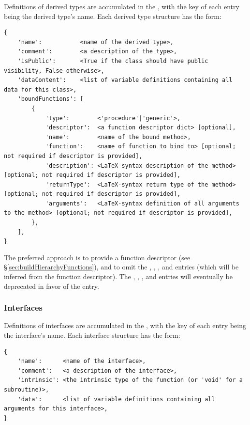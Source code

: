 Definitions of derived types are accumulated in the  , with the key of each entry being the derived type's name. Each derived type structure has the form:
\begin{verbatim}
{
    'name':           <name of the derived type>,
    'comment':        <a description of the type>,
    'isPublic':       <True if the class should have public visibility, False otherwise>,
    'dataContent':    <list of variable definitions containing all data for this class>,
    'boundFunctions': [
        {
            'type':        <'procedure'|'generic'>,
            'descriptor':  <a function descriptor dict> [optional],
            'name':        <name of the bound method>,
            'function':    <name of function to bind to> [optional; not required if descriptor is provided],
            'description': <LaTeX-syntax description of the method> [optional; not required if descriptor is provided],
            'returnType':  <LaTeX-syntax return type of the method> [optional; not required if descriptor is provided],
            'arguments':   <LaTeX-syntax definition of all arguments to the method> [optional; not required if descriptor is provided],
        },
    ],
}
\end{verbatim}
The preferred approach is to provide a function descriptor (see \S\ref{sec:buildHierarchyFunctions}), and to omit the , , , and  entries (which will be inferred from the function descriptor). The , , , and  entries will eventually be deprecated in favor of the  entry.

\subsubsection{Interfaces}\label{sec:buildHierarchyInterfaces}

Definitions of interfaces are accumulated in the  , with the key of each entry being the interface's name. Each interface structure has the form:
\begin{verbatim}
{
    'name':      <name of the interface>,
    'comment':   <a description of the interface>,
    'intrinsic': <the intrinsic type of the function (or 'void' for a subroutine)>,
    'data':      <list of variable definitions containing all arguments for this interface>,
}
\end{verbatim}

